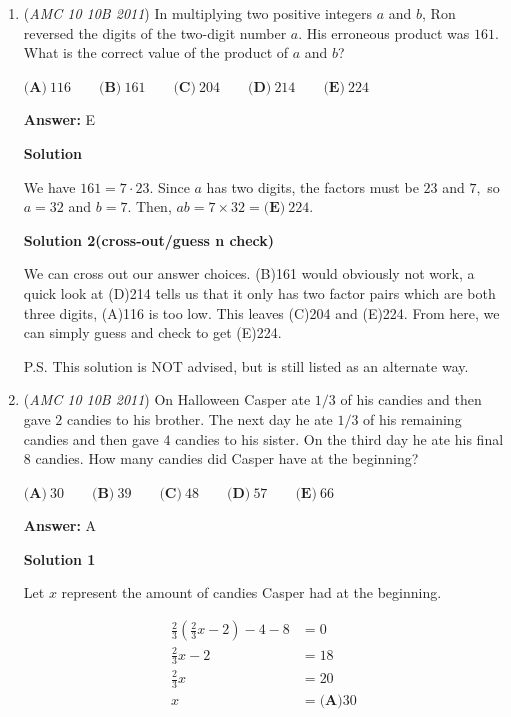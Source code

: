 \begin{enumerate}
	\item (\textit{AMC 10 10B 2011}) In multiplying two positive integers $a$ and $b$, Ron reversed the digits of the two-digit number $a$. His erroneous product was $161$. What is the correct value of the product of $a$ and $b$?


 $\textbf{(A)}\ 116 \qquad\textbf{(B)}\  161 \qquad\textbf{(C)}\  204 \qquad\textbf{(D)}\ 214 \qquad\textbf{(E)}\ 224$

 \textbf{Answer: }E



\textbf{Solution}

We have $161 = 7 \cdot 23.$ Since $a$ has two digits, the factors must be $23$ and $7,$ so $a = 32$ and $b = 7.$ Then, $ab = 7 \times 32 = \boxed{\mathrm{\textbf{(E)}\ } 224}.$




\textbf{Solution 2(cross-out/guess n check)}

We can cross out our answer choices. (B)161 would obviously not work, a quick look at (D)214 tells us that it only has two factor pairs which are both three digits, (A)116 is too low. This leaves (C)204 and (E)224. From here, we can simply guess and check to get (E)224.

 P.S. This solution is NOT advised, but is still listed as an alternate way.

 


	\item (\textit{AMC 10 10B 2011}) On Halloween Casper ate $1/3$ of his candies and then gave $2$ candies to his brother. The next day he ate $1/3$ of his remaining candies and then gave $4$ candies to his sister. On the third day he ate his final $8$ candies. How many candies did Casper have at the beginning?


 $\textbf{(A)}\ 30 \qquad\textbf{(B)}\ 39 \qquad\textbf{(C)}\ 48 \qquad\textbf{(D)}\ 57 \qquad\textbf{(E)}\ 66$

 \textbf{Answer: }A



\textbf{Solution 1}

Let $x$ represent the amount of candies Casper had at the beginning.

 
 \begin{align*} \frac{2}{3} \left(\frac{2}{3} x - 2\right) - 4 - 8 &= 0\\ \frac{2}{3} x - 2 &= 18\\ \frac{2}{3} x &= 20\\ x &= \boxed{\textbf{(A)} 30} \end{align*}






\end{enumerate}
